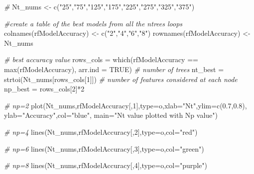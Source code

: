 \documentclass[
]{article}
\newenvironment{Shaded}{\begin{snugshade}}{\end{snugshade}}
\newcommand{\AttributeTok}[1]{\textcolor[rgb]{0.77,0.63,0.00}{#1}}
\newcommand{\CommentTok}[1]{\textcolor[rgb]{0.56,0.35,0.01}{\textit{#1}}}
\newcommand{\ConstantTok}[1]{\textcolor[rgb]{0.00,0.00,0.00}{#1}}
\newcommand{\DecValTok}[1]{\textcolor[rgb]{0.00,0.00,0.81}{#1}}
\newcommand{\FloatTok}[1]{\textcolor[rgb]{0.00,0.00,0.81}{#1}}
\newcommand{\FunctionTok}[1]{\textcolor[rgb]{0.00,0.00,0.00}{#1}}
\newcommand{\NormalTok}[1]{#1}
\newcommand{\OtherTok}[1]{\textcolor[rgb]{0.56,0.35,0.01}{#1}}
\newcommand{\SpecialCharTok}[1]{\textcolor[rgb]{0.00,0.00,0.00}{#1}}
\newcommand{\StringTok}[1]{\textcolor[rgb]{0.31,0.60,0.02}{#1}}
\begin{document}
\begin{Shaded}
\begin{Highlighting}[]
\CommentTok{\#}
\NormalTok{Nt\_nums }\OtherTok{\textless{}{-}} \FunctionTok{c}\NormalTok{(}\StringTok{"25"}\NormalTok{,}\StringTok{"75"}\NormalTok{,}\StringTok{"125"}\NormalTok{,}\StringTok{"175"}\NormalTok{,}\StringTok{"225"}\NormalTok{,}\StringTok{"275"}\NormalTok{,}\StringTok{"325"}\NormalTok{,}\StringTok{"375"}\NormalTok{)}

\CommentTok{\#create a table of the best models from all the ntree\textquotesingle{}s loops }
\FunctionTok{colnames}\NormalTok{(rfModelAccuracy) }\OtherTok{\textless{}{-}} \FunctionTok{c}\NormalTok{(}\StringTok{"2"}\NormalTok{,}\StringTok{"4"}\NormalTok{,}\StringTok{"6"}\NormalTok{,}\StringTok{"8"}\NormalTok{)}
\FunctionTok{rownames}\NormalTok{(rfModelAccuracy) }\OtherTok{\textless{}{-}}\NormalTok{ Nt\_nums}

\CommentTok{\# best accuracy value}
\NormalTok{rows\_cols }\OtherTok{=} \FunctionTok{which}\NormalTok{(rfModelAccuracy }\SpecialCharTok{==} \FunctionTok{max}\NormalTok{(rfModelAccuracy), }\AttributeTok{arr.ind =} \ConstantTok{TRUE}\NormalTok{)}
\CommentTok{\# number of trees}
\NormalTok{nt\_best }\OtherTok{=} \FunctionTok{strtoi}\NormalTok{(Nt\_nums[rows\_cols[}\DecValTok{1}\NormalTok{]])}
\CommentTok{\# number of features considered at each node}
\NormalTok{np\_best }\OtherTok{=}\NormalTok{ rows\_cols[}\DecValTok{2}\NormalTok{]}\SpecialCharTok{*}\DecValTok{2}



\CommentTok{\# np=2}
\FunctionTok{plot}\NormalTok{(Nt\_nums,rfModelAccuracy[,}\DecValTok{1}\NormalTok{],}\AttributeTok{type=}\StringTok{\textquotesingle{}o\textquotesingle{}}\NormalTok{,}\AttributeTok{xlab=}\StringTok{"Nt"}\NormalTok{,}\AttributeTok{ylim=}\FunctionTok{c}\NormalTok{(}\FloatTok{0.7}\NormalTok{,}\FloatTok{0.8}\NormalTok{), }\AttributeTok{ylab=}\StringTok{"Accuracy"}\NormalTok{,}\AttributeTok{col=}\StringTok{"blue"}\NormalTok{, }\AttributeTok{main=}\StringTok{"Nt value plotted with Np value"}\NormalTok{)}

\CommentTok{\# np=4}
\FunctionTok{lines}\NormalTok{(Nt\_nums,rfModelAccuracy[,}\DecValTok{2}\NormalTok{],}\AttributeTok{type=}\StringTok{\textquotesingle{}o\textquotesingle{}}\NormalTok{,}\AttributeTok{col=}\StringTok{"red"}\NormalTok{)}

\CommentTok{\# np=6}
\FunctionTok{lines}\NormalTok{(Nt\_nums,rfModelAccuracy[,}\DecValTok{3}\NormalTok{],}\AttributeTok{type=}\StringTok{\textquotesingle{}o\textquotesingle{}}\NormalTok{,}\AttributeTok{col=}\StringTok{"green"}\NormalTok{)}

\CommentTok{\# np=8}
\FunctionTok{lines}\NormalTok{(Nt\_nums,rfModelAccuracy[,}\DecValTok{4}\NormalTok{],}\AttributeTok{type=}\StringTok{\textquotesingle{}o\textquotesingle{}}\NormalTok{,}\AttributeTok{col=}\StringTok{"purple"}\NormalTok{)}


\end{Highlighting}
\end{Shaded}
\end{document}
